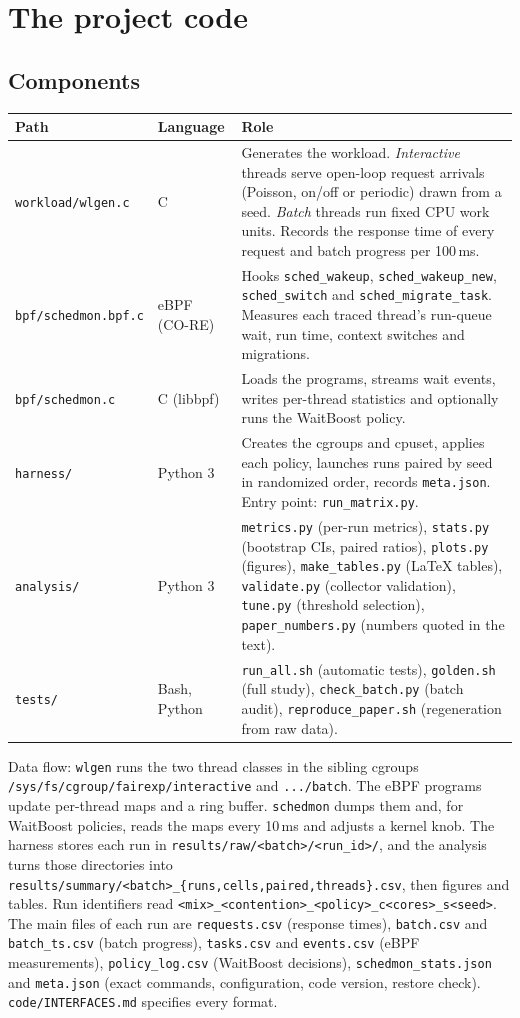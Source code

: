 \documentclass[10.5pt,a4paper]{article}
\newcommand{\f}[1]{\texttt{#1}}
\begin{document}
\section{The project code}

\subsection{Components}
\begin{tabularx}{\textwidth}{@{}l l L@{}}
\toprule
\textbf{Path} & \textbf{Language} & \textbf{Role} \\
\midrule
\f{workload/wlgen.c} & C & Generates the workload. \emph{Interactive} threads serve open-loop request arrivals (Poisson, on/off or periodic) drawn from a seed. \emph{Batch} threads run fixed CPU work units. Records the response time of every request and batch progress per 100\,ms. \\
\f{bpf/schedmon.bpf.c} & eBPF (CO-RE) & Hooks \f{sched\_wakeup}, \f{sched\_wakeup\_new}, \f{sched\_switch} and \f{sched\_migrate\_task}. Measures each traced thread's run-queue wait, run time, context switches and migrations. \\
\f{bpf/schedmon.c} & C (libbpf) & Loads the programs, streams wait events, writes per-thread statistics and optionally runs the WaitBoost policy. \\
\f{harness/} & Python 3 & Creates the cgroups and cpuset, applies each policy, launches runs paired by seed in randomized order, records \f{meta.json}. Entry point: \f{run\_matrix.py}. \\
\f{analysis/} & Python 3 & \f{metrics.py} (per-run metrics), \f{stats.py} (bootstrap CIs, paired ratios), \f{plots.py} (figures), \f{make\_tables.py} (LaTeX tables), \f{validate.py} (collector validation), \f{tune.py} (threshold selection), \f{paper\_numbers.py} (numbers quoted in the text). \\
\f{tests/} & Bash, Python & \f{run\_all.sh} (automatic tests), \f{golden.sh} (full study), \f{check\_batch.py} (batch audit), \f{reproduce\_paper.sh} (regeneration from raw data). \\
\bottomrule
\end{tabularx}

Data flow: \f{wlgen} runs the two thread classes in the sibling cgroups \f{/sys/fs/cgroup/fairexp/interactive} and \f{.../batch}. The eBPF programs update per-thread maps and a ring buffer. \f{schedmon} dumps them and, for WaitBoost policies, reads the maps every 10\,ms and adjusts a kernel knob. The harness stores each run in \f{results/raw/<batch>/<run\_id>/}, and the analysis turns those directories into \f{results/summary/<batch>\_\{runs,cells,paired,threads\}.csv}, then figures and tables. Run identifiers read \f{<mix>\_<contention>\_<policy>\_c<cores>\_s<seed>}. The main files of each run are \f{requests.csv} (response times), \f{batch.csv} and \f{batch\_ts.csv} (batch progress), \f{tasks.csv} and \f{events.csv} (eBPF measurements), \f{policy\_log.csv} (WaitBoost decisions), \f{schedmon\_stats.json} and \f{meta.json} (exact commands, configuration, code version, restore check). \f{code/INTERFACES.md} specifies every format.
\end{document}
